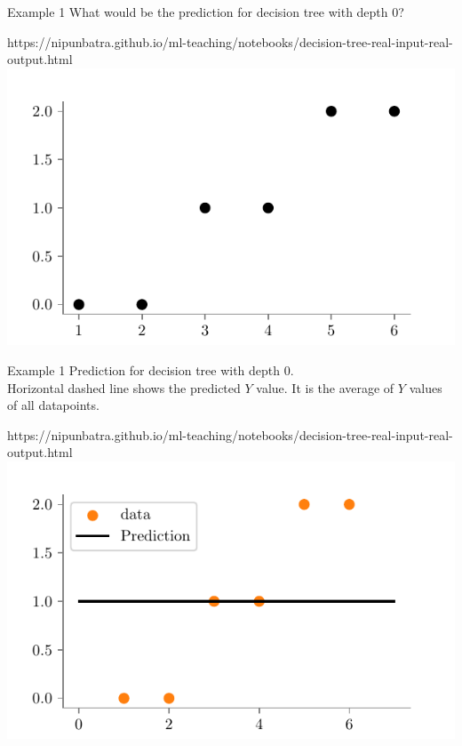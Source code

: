 \documentclass[usenames,dvipsnames]{beamer}
\begin{document}
\begin{frame}{Example 1}
What would be the prediction for decision tree with depth 0?
\begin{center}
	\begin{notebookbox}{https://nipunbatra.github.io/ml-teaching/notebooks/decision-tree-real-input-real-output.html}
		\includegraphics{../assets/decision-trees/figures/ri-ro-dataset.pdf}
	  \end{notebookbox}
\end{center}
\end{frame}

\begin{frame}{Example 1}
Prediction for decision tree with depth 0.\\
Horizontal dashed line shows the predicted $Y$ value. It is the average of $Y$ values of all datapoints.\\
\begin{center}
	\begin{notebookbox}{https://nipunbatra.github.io/ml-teaching/notebooks/decision-tree-real-input-real-output.html}
		\includegraphics{../assets/decision-trees/figures/ri-ro-depth-0.pdf}	
	  \end{notebookbox}
\end{center}
\end{frame}
\end{document}
